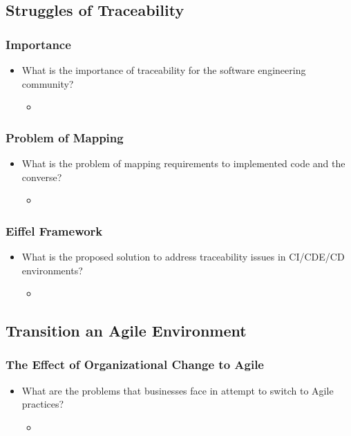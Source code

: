 \documentclass[11pt,a4paper]{article}
\begin{document}
	\subsection{Struggles of Traceability}
		\subsubsection{Importance}
		\begin{itemize}[noitemsep]
			\item What is the importance of traceability for the software engineering community?
			\begin{itemize}
				\item
			\end{itemize}
		\end{itemize}
		\subsubsection{Problem of Mapping}
		\begin{itemize}[noitemsep]
			\item What is the problem of mapping requirements to implemented code and the converse?
			\begin{itemize}
				\item
			\end{itemize}
		\end{itemize}
		\subsubsection{Eiffel Framework}
		\begin{itemize}[noitemsep]
			\item What is the proposed solution to address traceability issues in CI/CDE/CD environments?
			\begin{itemize}
				\item
			\end{itemize}
		\end{itemize}
		
	\subsection{Transition an Agile Environment}
		\subsubsection{The Effect of Organizational Change to Agile}
		\begin{itemize}[noitemsep]
			\item What are the problems that businesses face in attempt to switch to Agile practices?
			\begin{itemize}
				\item
			\end{itemize}
		\end{itemize}
\end{document}
